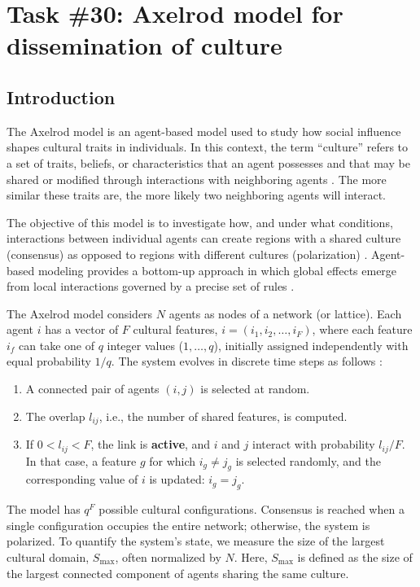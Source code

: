 \chapter{Task \#30: Axelrod model for dissemination of culture}

\section{Introduction}
The Axelrod model is an agent-based model used to study how social influence shapes cultural traits in individuals. In this context, the term ``culture'' refers to a set of traits, beliefs, or characteristics that an agent possesses and that may be shared or modified through interactions with neighboring agents \cite{axelrod_introduction}. The more similar these traits are, the more likely two neighboring agents will interact.

The objective of this model is to investigate how, and under what conditions, interactions between individual agents can create regions with a shared culture (consensus) as opposed to regions with different cultures (polarization) \cite{axelrod_algorithm}. Agent-based modeling provides a bottom-up approach in which global effects emerge from local interactions governed by a precise set of rules \cite{axelrod_introduction}.

The Axelrod model considers $N$ agents as nodes of a network (or lattice). Each agent $i$ has a vector of $F$ cultural features, $i = (i_1, i_2, \dots, i_F)$, where each feature $i_f$ can take one of $q$ integer values ($1, \dots, q$), initially assigned independently with equal probability $1/q$. The system evolves in discrete time steps as follows \cite{axelrod_algorithm}:

\begin{enumerate}
    \item A connected pair of agents $(i, j)$ is selected at random.
    \item The overlap $l_{ij}$, i.e., the number of shared features, is computed.
    \item If $0 < l_{ij} < F$, the link is \textbf{active}, and $i$ and $j$ interact with probability $l_{ij}/F$. In that case, a feature $g$ for which $i_g \neq j_g$ is selected randomly, and the corresponding value of $i$ is updated: $i_g = j_g$.
\end{enumerate}

The model has $q^F$ possible cultural configurations. Consensus is reached when a single configuration occupies the entire network; otherwise, the system is polarized. To quantify the system's state, we measure the size of the largest cultural domain, $S_{\max}$, often normalized by $N$. Here, $S_{\max}$ is defined as the size of the largest connected component of agents sharing the same culture.

